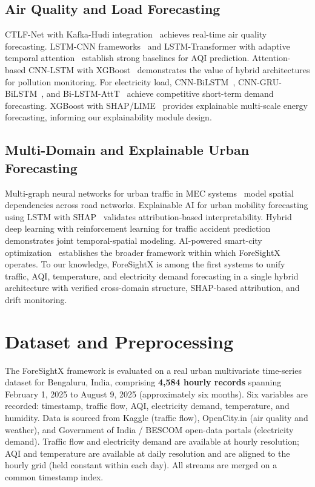 \documentclass[conference]{IEEEtran}
\begin{document}
\subsection{Air Quality and Load Forecasting}
CTLF-Net with Kafka-Hudi integration~\cite{ref18} achieves real-time air quality forecasting. LSTM-CNN frameworks~\cite{ref19,ref20} and LSTM-Transformer with adaptive temporal attention~\cite{ref21} establish strong baselines for AQI prediction. Attention-based CNN-LSTM with XGBoost~\cite{ref22} demonstrates the value of hybrid architectures for pollution monitoring. For electricity load, CNN-BiLSTM~\cite{ref7}, CNN-GRU-BiLSTM~\cite{ref8}, and Bi-LSTM-AttT~\cite{ref9} achieve competitive short-term demand forecasting. XGBoost with SHAP/LIME~\cite{ref10} provides explainable multi-scale energy forecasting, informing our explainability module design.

\subsection{Multi-Domain and Explainable Urban Forecasting}
Multi-graph neural networks for urban traffic in MEC systems~\cite{ref23} model spatial dependencies across road networks. Explainable AI for urban mobility forecasting using LSTM with SHAP~\cite{ref2} validates attribution-based interpretability. Hybrid deep learning with reinforcement learning for traffic accident prediction~\cite{ref11} demonstrates joint temporal-spatial modeling. AI-powered smart-city optimization~\cite{ref1} establishes the broader framework within which ForeSightX operates. To our knowledge, ForeSightX is among the first systems to unify traffic, AQI, temperature, and electricity demand forecasting in a single hybrid architecture with verified cross-domain structure, SHAP-based attribution, and drift monitoring.

\section{Dataset and Preprocessing}
The ForeSightX framework is evaluated on a real urban multivariate time-series dataset for Bengaluru, India, comprising \textbf{4{,}584 hourly records} spanning February 1, 2025 to August 9, 2025 (approximately six months). Six variables are recorded: timestamp, traffic flow, AQI, electricity demand, temperature, and humidity. Data is sourced from Kaggle (traffic flow), OpenCity.in (air quality and weather), and Government of India / BESCOM open-data portals (electricity demand). Traffic flow and electricity demand are available at hourly resolution; AQI and temperature are available at daily resolution and are aligned to the hourly grid (held constant within each day). All streams are merged on a common timestamp index.
\end{document}

